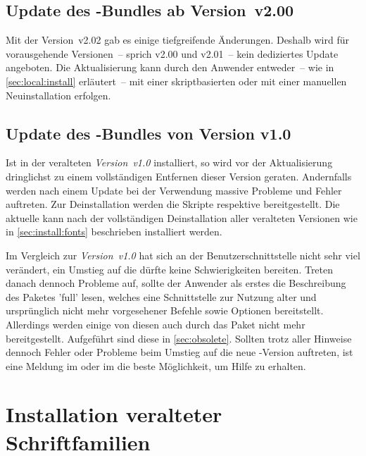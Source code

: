 \subsection{Update des \TUDScript-Bundles ab Version~v2.00}
%
Mit der Version~v2.02 gab es einige tiefgreifende Änderungen. Deshalb wird für 
vorausgehende Versionen~-- sprich v2.00 und v2.01~-- kein dediziertes Update 
angeboten. Die Aktualisierung kann durch den Anwender entweder~-- wie in 
\autoref{sec:local:install} erläutert~-- mit einer skriptbasierten oder mit 
einer manuellen Neuinstallation erfolgen.
%


\subsection{Update des \TUDScript-Bundles von Version v1.0}
%
Ist \TUDScript in der veralteten \emph{Version~v1.0} installiert, so wird vor 
der Aktualisierung dringlichst zu einem vollständigen Entfernen dieser Version 
geraten. Andernfalls werden nach einem Update bei der Verwendung massive 
Probleme und Fehler auftreten. Zur Deinstallation werden die Skripte 
respektive
bereitgestellt. Die aktuelle  kann nach der vollständigen 
Deinstallation aller veralteten Versionen wie in \autoref{sec:install:fonts} 
beschrieben installiert werden.

Im Vergleich zur \emph{Version~v1.0} hat sich an der Benutzerschnittstelle 
nicht sehr viel verändert, ein Umstieg auf die  dürfte 
keine Schwierigkeiten bereiten. Treten danach dennoch Probleme auf, sollte der 
Anwender als erstes die Beschreibung des Paketes 'full' 
lesen, welches eine Schnittstelle zur Nutzung alter und ursprünglich nicht mehr 
vorgesehener Befehle sowie Optionen bereitstellt. Allerdings werden einige von 
diesen auch durch das Paket  nicht mehr bereitgestellt. 
Aufgeführt sind diese in \autoref{sec:obsolete}. Sollten trotz aller Hinweise 
dennoch Fehler oder Probleme beim Umstieg auf die neue \TUDScript-Version 
auftreten, ist eine Meldung im \Forum oder im \GitHubRepo[issues] die beste 
Möglichkeit, um Hilfe zu erhalten.



\section{Installation veralteter Schriftfamilien}
%
%

